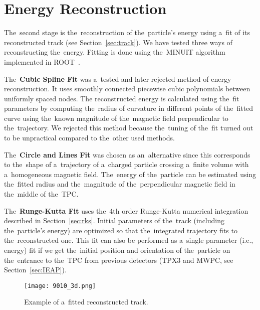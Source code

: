 \chapter{Energy Reconstruction}
\label{sec:energy}
	The~second stage is the~reconstruction of the~particle's energy using a~fit of its reconstructed track (see Section~\ref{sec:track}). We have tested three ways of reconstructing the~energy. Fitting is done using the~MINUIT algorithm implemented in ROOT~\cite{ROOT}.
	
	The~\textbf{Cubic Spline Fit} was a~tested and later rejected method of energy reconstruction. It uses smoothly connected piecewise cubic polynomials between uniformly spaced nodes. The reconstructed energy is calculated using the~fit parameters by computing the~radius of curvature in different points of the~fitted curve using the~known magnitude of the~magnetic field perpendicular to the~trajectory. We rejected this method because the~tuning of the~fit turned out to be unpractical compared to the~other used methods.
	
	The~\textbf{Circle and Lines Fit} was chosen as an~alternative since this corresponds to the~shape of a~trajectory of a~charged particle crossing a~finite volume with a~homogeneous magnetic field. The~energy of the~particle can be estimated using the~fitted radius and the~magnitude of the~perpendicular magnetic field in the~middle of the~\ac{TPC}.
	
	The~\textbf{Runge-Kutta Fit} uses the~4th order Runge-Kutta numerical integration described in Section~\ref{sec:rks}. Initial parameters of the~track (including the~particle's energy) are optimized so that the~integrated trajectory fits to the~reconstructed one. This fit can also be performed as a~single parameter (i.e., energy) fit if we get the~initial position and orientation of the~particle on the~entrance to the~\ac{TPC} from previous detectors (\ac{TPX3} and \ac{MWPC}, see Section~\ref{sec:IEAP}).
	
	\begin{figure}
		\centering
		\texttt{[image: 9010\_3d.png]}
		\caption{Example of a~fitted reconstructed track.}
		\label{fig:90103d}
	\end{figure}
	
